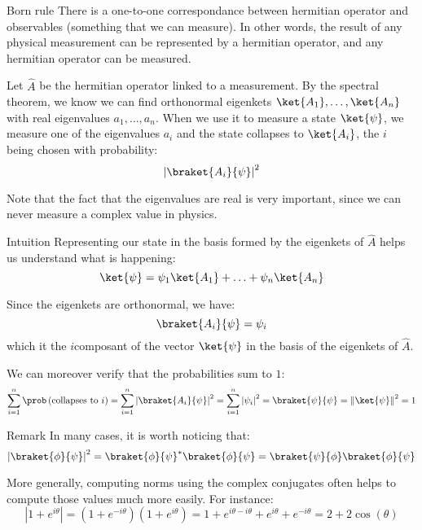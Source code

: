 \documentclass[a4paper]{article}
\begin{document}
\begin{parag}{Born rule}
    There is a one-to-one correspondance between hermitian operator and observables (something that we can measure). In other words, the result of any physical measurement can be represented by a hermitian operator, and any hermitian operator can be measured.

    Let $\hat{A}$ be the hermitian operator linked to a measurement. By the spectral theorem, we know we can find orthonormal eigenkets $\ket{A_1}, \ldots, \ket{A_n}$ with real eigenvalues $a_1, \ldots, a_n$. When we use it to measure a state $\ket{\psi}$, we measure one of the eigenvalues $a_i$ and the state collapses to $\ket{A_i}$, the $i$ being chosen with probability: 
    \[\left|\braket{A_i}{\psi}\right|^2\]

    Note that the fact that the eigenvalues are real is very important, since we can never measure a complex value in physics.

    \begin{subparag}{Intuition}
        Representing our state in the basis formed by the eigenkets of $\hat{A}$ helps us understand what is happening: 
        \[\ket{\psi} = \psi_1 \ket{A_1} + \ldots + \psi_n \ket{A_n}\]
        
        Since the eigenkets are orthonormal, we have: 
        \[\braket{A_i}{\psi} = \psi_i\]
        which it the $i$\Th composant of the vector $\ket{\psi}$ in the basis of the eigenkets of $\hat{A}$.

        We can moreover verify that the probabilities sum to $1$:
        \[\sum_{i=1}^{n} \prob\left(\text{collapses to $i$}\right) = \sum_{i=1}^{n}\left|\braket{A_i}{\psi}\right|^2 = \sum_{i=1}^{n}\left|\psi_i\right|^2 = \braket{\psi}{\psi} = \left\|\ket{\psi}\right\|^2 = 1\]
    \end{subparag}

    \begin{subparag}{Remark}
        In many cases, it is worth noticing that: 
        \[\left|\braket{\phi}{\psi}\right|^2 = \braket{\phi}{\psi}^* \braket{\phi}{\psi} = \braket{\psi}{\phi}\braket{\phi}{\psi}\]
        
        More generally, computing norms using the complex conjugates often helps to compute those values much more easily. For instance: 
        \[\left|1 + e^{i\theta}\right| = \left(1 + e^{-i\theta}\right)\left(1 + e^{i\theta}\right) = 1 + e^{i\theta - i\theta} + e^{i\theta} + e^{-i\theta} = 2 + 2\cos\left(\theta\right)\]
    \end{subparag}
\end{parag}
\end{document}
